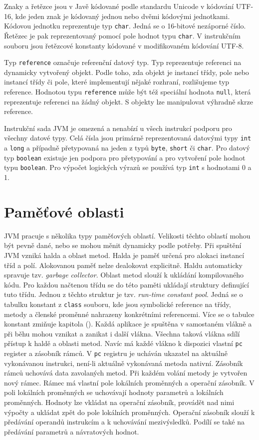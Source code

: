 Znaky a řetězce jsou v Javě kódované podle standardu Unicode v kódování UTF-16, kde jeden znak je kódovaný jednou nebo dvěmi kódovými jednotkami. Kódovou jednotku reprezentuje typ \texttt{char}. Jedná se o 16-bitové nezáporné číslo. Řetězec je pak reprezentovaný pomocí pole hodnot typu \texttt{char}. V instrukčním souboru jsou řetězcové konstanty kódované v modifikovaném kódování UTF-8. 

Typ \texttt{reference} označuje referenční datový typ. Typ reprezentuje referenci na dynamicky vytvořený objekt. Podle toho, zda objekt je instancí třídy, pole nebo instancí třídy či pole, které implementují nějaké rozhraní, rozlišujeme typ reference. Hodnotou typu \texttt{reference} může být též speciální hodnota \texttt{null}, která reprezentuje referenci na žádný objekt. S objekty lze manipulovat výhradně skrze reference.





Instrukční sada JVM je omezená a nenabízí u všech instrukcí podporu pro všechny datové typy. Celá čísla jsou primárně reprezentovaná datovými typy \texttt{int} a \texttt{long} a případně přetypovaná na jeden z typů \texttt{byte}, \texttt{short} či \texttt{char}. Pro datový typ \texttt{boolean} existuje jen podpora pro přetypování a pro vytvoření pole hodnot typu \texttt{boolean}. Pro výpočet logických výrazů se používá typ \texttt{int} s hodnotami 0 a 1.


\section{Paměťové oblasti}

JVM pracuje s několika typy paměťových oblastí. Velikosti těchto oblastí mohou být pevně dané, nebo se mohou měnit dynamicky podle potřeby. Při spuštění JVM vzniká halda a oblast metod. Halda je paměť určená pro alokaci instancí tříd a polí. Alokovanou paměť nelze dealokovat explicitně. Haldu automaticky spravuje tzv. \textit{garbage collector}. Oblast metod slouží k ukládání kompilovaného kódu. Pro každou načtenou třídu se do této paměti ukládají struktury definující tuto třídu. Jednou z těchto struktur je tzv. \textit{run-time constant pool}. Jedná se o tabulku konstant z \texttt{class} souboru, kde jsou symbolické reference na třídy, metody a členské proměnné nahrazeny konkrétními referencemi. Více se o tabulce konstant zmiňuje kapitola (). Každá aplikace je spuštěna v samostaném vlákně a při běhu mohou vznikat a zanikat i další vlákna. Všechna taková vlákna sdílí přístup k haldě a oblasti metod. Navíc má každé vlákno k dispozici vlastní \texttt{pc} register a zásobník rámců. V \texttt{pc} registru je ucháván ukazatel na aktuálně vykonávanou instrukci, není-li aktuálně vykonávaná metoda nativní. Zásobník rámců uchovává data zavolaných metod. Při každém volání metody je vytvořen nový rámec. Rámec má vlastní pole lokálních proměnných a operační zásobník. V poli lokálních proměnných se uchovávají hodnoty parametrů a lokálních proměnných. Hodnoty lze vkládat na operační zásobník, provádět nad nimi výpočty a ukládat zpět do pole lokálních proměnných. Operační zásobník slouží k předávání operandů instrukcím a k uchovávání mezivýsledků. Podílí se také na předávání parametrů a návratových hodnot.

